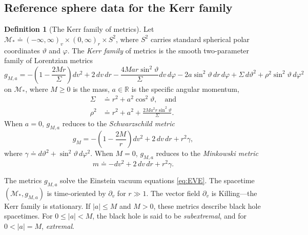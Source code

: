 \documentclass[10pt]{article}
\numberwithin{equation}{section}
\theoremstyle{plain}
\theoremstyle{definition}
\newtheorem{defn}{Definition}[section]
\renewcommand{\Bbb}{\mathbb}
\begin{document}
\subsection{Reference sphere data for the Kerr family} \label{sec:ref-sphere-data}

\begin{defn}[The Kerr family of metrics]
    Let $\mathcal M_*\doteq(-\infty,\infty)_v\times (0,\infty)_r\times S^2$, where $S^2$ carries standard spherical polar coordinates $\vartheta$ and $\varphi$. The \emph{Kerr family} of metrics is the smooth two-parameter family of Lorentzian metrics 
     \begin{equation}
        g_{M,a} = -\left(1-\frac{2Mr}{\Sigma}\right) dv^2 + 2\,dv\,dr - \frac{4Mar\sin^2\vartheta}{\Sigma}dv\,d\varphi -2a\sin^2\vartheta \,dr\,d\varphi + \Sigma\,d\vartheta^2 + \rho^2 \sin^2\vartheta\,d\varphi^2
        \label{eq:Kerr-2}
    \end{equation}
    on $\mathcal M_*$, where $M\ge 0$ is the mass, $a\in \Bbb R$ is the specific angular momentum, 
    \begin{align*}
        \Sigma&\doteq r^2+a^2\cos^2\vartheta,\quad\text{and}\\
        \rho^2&\doteq r^2+a^2 +\frac{2Ma^2r\sin^2\vartheta}{\Sigma}.
    \end{align*} When $a=0$, $g_{M,a}$ reduces to the \emph{Schwarzschild metric} 
    \begin{equation}
    g_M= -\left(1-\frac{2M}{r}\right) dv^2 +2\,dv\,dr + r^2 \gamma,
\end{equation} where $\gamma\doteq d\vartheta^2+\sin^2\vartheta\,d\varphi^2$. 
When $M=0$, $g_{M,a}$ reduces to the \emph{Minkowski metric}
\begin{equation*}
    m\doteq -dv^2+2\,dv\,dr+r^2\gamma.
\end{equation*}
\end{defn}

The metrics $g_{M,a}$ solve the Einstein vacuum equations \eqref{eq:EVE}. The spacetime $(\mathcal M_*,g_{M,a})$ is time-oriented by $\partial_v$ for $r\gg 1$. The vector field $\partial_v$ is Killing---the Kerr family is stationary. If $|a|\le M$ and $M>0$, these metrics describe black hole spacetimes. For $0\le |a|<M$, the black hole is said to be \emph{subextremal}, and for $0< |a|=M$, \emph{extremal}.
\end{document}
